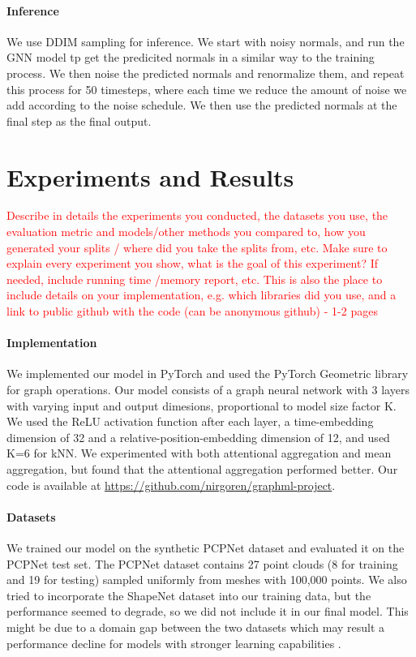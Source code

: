 \documentclass{acmart}
\begin{document}
\paragraph{Inference}
We use DDIM sampling for inference. We start with noisy normals, and run the GNN model tp get the predicited normals in a similar way to the training process. We then noise the predicted normals and renormalize them, and repeat this process for 50 timesteps, where each time we reduce the amount of noise we add according to the noise schedule. We then use the predicted normals at the final step as the final output.

\section{Experiments and Results}
\textcolor{red}{Describe in details the experiments you conducted, the datasets you use, the evaluation metric and models/other methods you compared to, how you generated your splits / where did you take the splits from, etc. Make sure to explain every experiment you show, what is the goal of this experiment? If needed, include running time /memory report, etc.
This is also the place to include details on your implementation, e.g. which libraries did you use, and a link to public github with the code (can be anonymous github) - 1-2 pages}

\paragraph{Implementation}
We implemented our model in PyTorch and used the PyTorch Geometric library for graph operations. Our model consists of a graph neural network with 3 layers with varying input and output dimesions, proportional to model size factor K. We used the ReLU activation function after each layer, a time-embedding dimension of 32 and a relative-position-embedding dimension of 12, and used K=6 for kNN. We experimented with both attentional aggregation and mean aggregation, but found that the attentional aggregation performed better. Our code is available at \url{https://github.com/nirgoren/graphml-project}.

\paragraph{Datasets}
We trained our model on the synthetic PCPNet dataset \cite{guerrero2018pcpnet} and evaluated it on the PCPNet test set. The PCPNet dataset contains 27 point clouds (8 for training and 19 for testing) sampled uniformly from meshes with 100,000 points. We also tried to incorporate the ShapeNet dataset \cite{shapenet2015} into our training data, but the performance seemed to degrade, so we did not include it in our final model. This might be due to a domain gap between the two datasets which may result a performance decline for models with stronger learning capabilities \cite{jin2024asymmetrical}.
\end{document}
